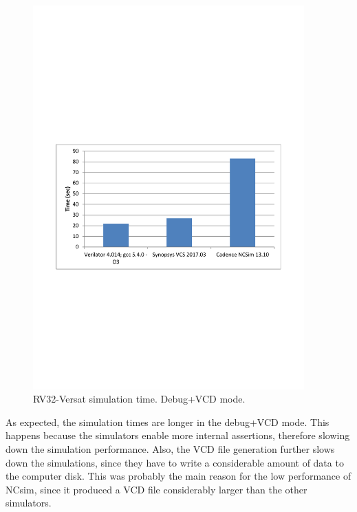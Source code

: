 \begin{figure}[!htb]
	\centering
	\includegraphics[trim=0 250 0 290 , clip, 
	width=0.93\textwidth]{Figures/benchmark_vcd.pdf}
	\caption{RV32-Versat simulation time. Debug+VCD mode.}
	\label{fig:benchmark_vcd}
\end{figure}

As expected, the simulation times are longer in the debug+\ac{VCD} mode. This happens
because the simulators enable more internal assertions, therefore slowing down
the simulation performance.  Also, the \ac{VCD} file generation further slows down
the simulations, since they have to write a considerable amount of data to the
computer disk. This was probably the main reason for the low performance of
NCsim, since it produced a \ac{VCD} file considerably larger than the other
simulators.

